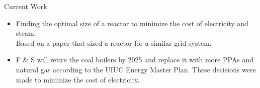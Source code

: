 \begin{frame}
	\large Current Work\\

	\begin{itemize}
		\item Finding the optimal size of a reactor to minimize the cost of electricity and steam. \\
		Based on a paper \cite{baker_optimal_2018} that sized a reactor for a similar grid system. 
		\item F \& S will retire the coal boilers by 2025 and replace it with more PPAs and natural gas \cite{affiliated_engineers_inc_utilities_2015} according to the UIUC Energy Master Plan. These decisions were made to minimize the cost of electricity.
	\end{itemize}
\end{frame}